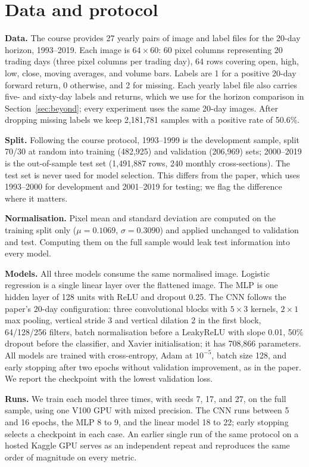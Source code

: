 \documentclass[10pt]{article}
\begin{document}
\section{Data and protocol}

\textbf{Data.} The course provides 27 yearly pairs of image and label files for the 20-day horizon, 1993--2019. Each image is $64\times60$: 60 pixel columns representing 20 trading days (three pixel columns per trading day), 64 rows covering open, high, low, close, moving averages, and volume bars. Labels are 1 for a positive 20-day forward return, 0 otherwise, and 2 for missing. Each yearly label file also carries five- and sixty-day labels and returns, which we use for the horizon comparison in Section~\ref{sec:beyond}; every experiment uses the same 20-day images. After dropping missing labels we keep 2{,}181{,}781 samples with a positive rate of 50.6\%.

\textbf{Split.} Following the course protocol, 1993--1999 is the development sample, split 70/30 at random into training (482{,}925) and validation (206{,}969) sets; 2000--2019 is the out-of-sample test set (1{,}491{,}887 rows, 240 monthly cross-sections). The test set is never used for model selection. This differs from the paper, which uses 1993--2000 for development and 2001--2019 for testing; we flag the difference where it matters.

\textbf{Normalisation.} Pixel mean and standard deviation are computed on the training split only ($\mu=0.1069$, $\sigma=0.3090$) and applied unchanged to validation and test. Computing them on the full sample would leak test information into every model.

\textbf{Models.} All three models consume the same normalised image. Logistic regression is a single linear layer over the flattened image. The MLP is one hidden layer of 128 units with ReLU and dropout 0.25. The CNN follows the paper's 20-day configuration: three convolutional blocks with $5\times3$ kernels, $2\times1$ max pooling, vertical stride 3 and vertical dilation 2 in the first block, 64/128/256 filters, batch normalisation before a LeakyReLU with slope 0.01, 50\% dropout before the classifier, and Xavier initialisation; it has 708{,}866 parameters. All models are trained with cross-entropy, Adam at $10^{-5}$, batch size 128, and early stopping after two epochs without validation improvement, as in the paper. We report the checkpoint with the lowest validation loss.

\textbf{Runs.} We train each model three times, with seeds 7, 17, and 27, on the full sample, using one V100 GPU with mixed precision. The CNN runs between 5 and 16 epochs, the MLP 8 to 9, and the linear model 18 to 22; early stopping selects a checkpoint in each case. An earlier single run of the same protocol on a hosted Kaggle GPU serves as an independent repeat and reproduces the same order of magnitude on every metric.
\end{document}
